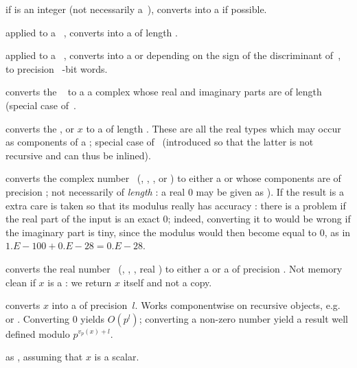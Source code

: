  if  is an integer (not necessarily
a~), converts  into a  if possible.

 applied to a ~, converts
 into a  of length .

 applied to a ~, converts
 into a  or  depending on the sign of the
discriminant of~, to precision \hbox{ \B-bit} words.

 converts the ~ to a
a complex whose real and imaginary parts are  of length 
(special case of~.

 converts the
,  or  $x$ to a  of length .
These are all the real types which may occur as components of a
; special case of~ (introduced so that the latter is
not recursive and can thus be inlined).

 converts the complex number~
(, , ,  or ) to either
a  or  whose components are  of precision
; not necessarily of \emph{length} : a real $0$ may be
given as ). If the result is a  extra care is
taken so that its modulus really has accuracy : there is a problem
if the real part of the input is an exact $0$; indeed, converting it to
 would be wrong if the imaginary part is tiny, since the
modulus would then become equal to $0$, as in $1.E-100 + 0.E-28 = 0.E-28$.

 converts the real number~
(, , , real ) to either
a  or a  of precision . Not memory clean
if $x$ is a : we return $x$ itself and not a copy.

 converts $x$ into a 
of precision~$l$. Works componentwise on recursive objects,
e.g.~ or . Converting $0$ yields $O(p^l)$; converting a
non-zero number yield a result well defined modulo $p^{v_p(x) + l}$.

 as , assuming that $x$
is a scalar.


